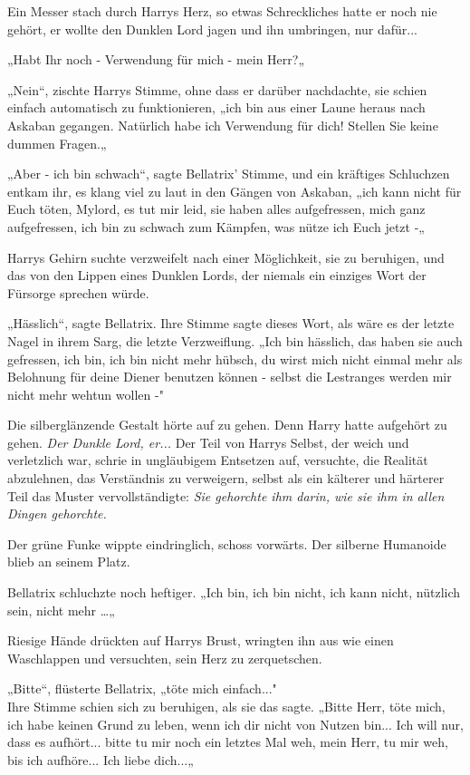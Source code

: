 {Ein Messer stach durch Harrys Herz, so etwas Schreckliches hatte er noch nie gehört, er wollte den Dunklen Lord jagen und ihn umbringen, nur dafür...

„Habt Ihr noch - Verwendung für mich - mein Herr?„

„Nein“, zischte Harrys Stimme, ohne dass er darüber nachdachte, sie schien einfach automatisch zu funktionieren, „ich bin aus einer Laune heraus nach Askaban gegangen. Natürlich habe ich Verwendung für dich! Stellen Sie keine dummen Fragen.„

„Aber - ich bin schwach“, sagte Bellatrix' Stimme, und ein kräftiges Schluchzen entkam ihr, es klang viel zu laut in den Gängen von Askaban, „ich kann nicht für Euch töten, Mylord, es tut mir leid, sie haben alles aufgefressen, mich ganz aufgefressen, ich bin zu schwach zum Kämpfen, was nütze ich Euch jetzt -„

Harrys Gehirn suchte verzweifelt nach einer Möglichkeit, sie zu beruhigen, und das von den Lippen eines Dunklen Lords, der niemals ein einziges Wort der Fürsorge sprechen würde.

„Hässlich“, sagte Bellatrix. Ihre Stimme sagte dieses Wort, als wäre es der letzte Nagel in ihrem Sarg, die letzte Verzweiflung. „Ich bin hässlich, das haben sie auch gefressen, ich bin, ich bin nicht mehr hübsch, du wirst mich nicht einmal mehr als Belohnung für deine Diener benutzen können - selbst die Lestranges werden mir nicht mehr wehtun wollen -"

Die silberglänzende Gestalt hörte auf zu gehen. Denn Harry hatte aufgehört zu gehen. \emph{Der Dunkle Lord, er...} Der Teil von Harrys Selbst, der weich und verletzlich war, schrie in ungläubigem Entsetzen auf, versuchte, die Realität abzulehnen, das Verständnis zu verweigern, selbst als ein kälterer und härterer Teil das Muster vervollständigte: \emph{Sie gehorchte ihm darin, wie sie ihm in allen Dingen gehorchte.}

Der grüne Funke wippte eindringlich, schoss vorwärts. Der silberne Humanoide blieb an seinem Platz.

Bellatrix schluchzte noch heftiger. „Ich bin, ich bin nicht, ich kann nicht, nützlich sein, nicht mehr …„

Riesige Hände drückten auf Harrys Brust, wringten ihn aus wie einen Waschlappen und versuchten, sein Herz zu zerquetschen.

„Bitte“, flüsterte Bellatrix, „töte mich einfach..."\\ Ihre Stimme schien sich zu beruhigen, als sie das sagte. „Bitte Herr, töte mich, ich habe keinen Grund zu leben, wenn ich dir nicht von Nutzen bin... Ich will nur, dass es aufhört... bitte tu mir noch ein letztes Mal weh, mein Herr, tu mir weh, bis ich aufhöre... Ich liebe dich...„

}
